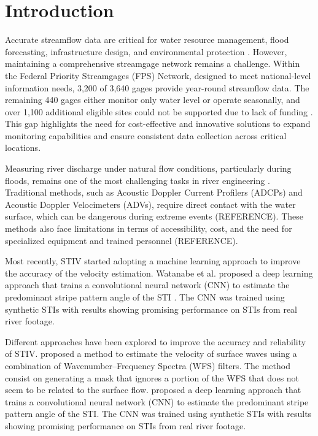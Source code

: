 \documentclass[12pt]{elsarticle}
\begin{document}
\section{Introduction}
Accurate streamflow data are critical for water resource management, flood forecasting, infrastructure design, and environmental protection \cite{olson2007us, noauthor_guide_2008}. However, maintaining a comprehensive streamgage network remains a challenge. Within the Federal Priority Streamgages (FPS) Network, designed to meet national-level information needs, 3,200 of 3,640 gages provide year-round streamflow data. The remaining 440 gages either monitor only water level or operate seasonally, and over 1,100 additional eligible sites could not be supported due to lack of funding \cite{eberts2019monitoring}. This gap highlights the need for cost-effective and innovative solutions to expand monitoring capabilities and ensure consistent data collection across critical locations.

Measuring river discharge under natural flow conditions, particularly during floods, remains one of the most challenging tasks in river engineering \cite{fujita2019efficient, fujita2007development, muste2008large}. Traditional methods, such as Acoustic Doppler Current Profilers (ADCPs) and Acoustic Doppler Velocimeters (ADVs), require direct contact with the water surface, which can be dangerous during extreme events (REFERENCE). These methods also face limitations in terms of accessibility, cost, and the need for specialized equipment and trained personnel (REFERENCE).

Most recently, STIV started adopting a machine learning approach to improve the accuracy of the velocity estimation. Watanabe et al. proposed a deep learning approach that trains a convolutional neural network (CNN) to estimate the predominant stripe pattern angle of the STI \cite{watanabe2021improving}. The CNN was trained using synthetic STIs with results showing promising performance on STIs from real river footage.

Different approaches have been explored to improve the accuracy and reliability of STIV. \cite{fujita2020application} proposed a method to estimate the velocity of surface waves using a combination of Wavenumber–Frequency Spectra (WFS) filters. The method consist on generating a mask that ignores a portion of the WFS that does not seem to be related to the surface flow. \cite{watanabe2021improving} proposed a deep learning approach that trains a convolutional neural network (CNN) to estimate the predominant stripe pattern angle of the STI. The CNN was trained using synthetic STIs with results showing promising performance on STIs from real river footage.
\end{document}
